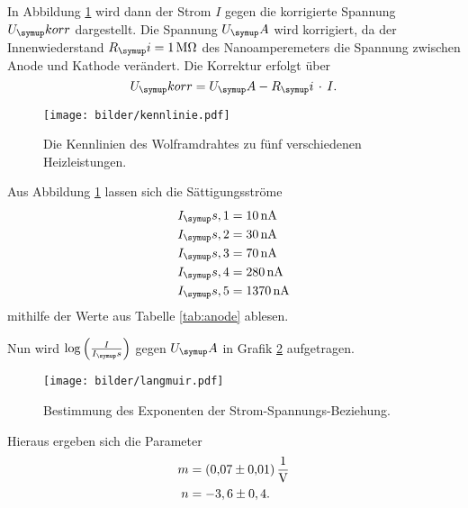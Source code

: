 In Abbildung \ref{fig:kenn} wird dann der Strom $I$ gegen die korrigierte Spannung $U_\su{korr}$
dargestellt. Die Spannung $U_\su{A}$ wird korrigiert, da der Innenwiederstand
$R_\su{i} = \SI{1}{\mega\ohm}$ des Nanoamperemeters die Spannung zwischen
Anode und Kathode verändert. Die Korrektur erfolgt über
\begin{equation}
  U_\su{korr} = U_\su{A}-R_\su{i}\,\cdot\, I. \\
\end{equation}
\begin{figure}[H]
  \centering
  \texttt{[image: bilder/kennlinie.pdf]}
  \caption{Die Kennlinien des Wolframdrahtes zu fünf verschiedenen Heizleistungen.}
  \label{fig:kenn}
\end{figure}
Aus Abbildung \ref{fig:kenn} lassen sich die Sättigungsströme
\begin{align*}
  I_\su{s,1} &= \SI{10}{\nano\ampere}  \\
  I_\su{s,2} &= \SI{30}{\nano\ampere} \\
  I_\su{s,3} &= \SI{70}{\nano\ampere}  \\
  I_\su{s,4} &= \SI{280}{\nano\ampere}  \\
  I_\su{s,5} &= \SI{1370}{\nano\ampere}  \\
\end{align*}
mithilfe der Werte aus Tabelle \ref{tab:anode} ablesen.

Nun wird $\log{\left(\frac{I}{I_\su{s}}\right)}$ gegen $U_\su{A}$ in Grafik \ref{fig:langmuir}
aufgetragen.
\begin{figure}[H]
  \centering
  \texttt{[image: bilder/langmuir.pdf]}
  \caption{Bestimmung des Exponenten der Strom-Spannungs-Beziehung.}
  \label{fig:langmuir}
\end{figure}
Hieraus ergeben sich die Parameter
\begin{align*}
  m &= \SI[per-mode=fraction]{0,07\pm0,01}{\per\volt} \\
  n &= -3,6\pm0,4. \\
\end{align*}

